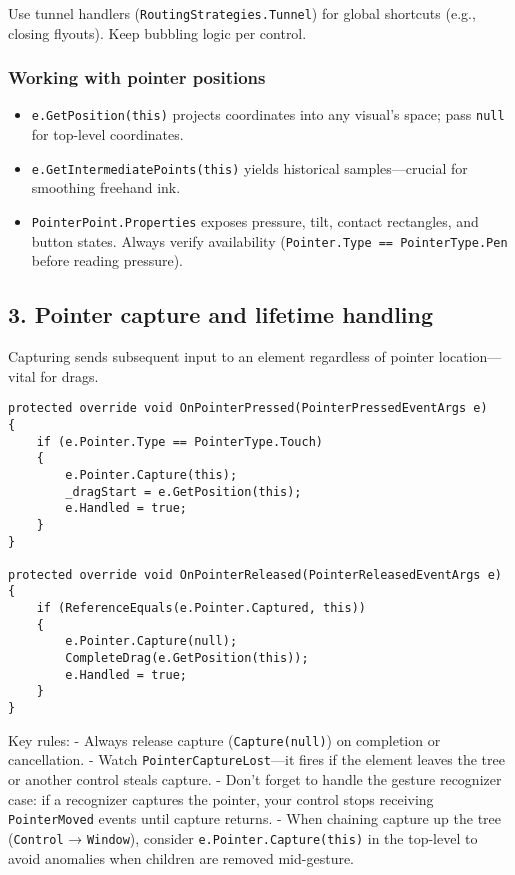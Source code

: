 Use tunnel handlers (\passthrough{\lstinline!RoutingStrategies.Tunnel!})
for global shortcuts (e.g., closing flyouts). Keep bubbling logic per
control.

\subsubsection{Working with pointer
positions}\label{working-with-pointer-positions}

\begin{itemize}
\tightlist
\item
  \passthrough{\lstinline!e.GetPosition(this)!} projects coordinates
  into any visual's space; pass \passthrough{\lstinline!null!} for
  top-level coordinates.
\item
  \passthrough{\lstinline!e.GetIntermediatePoints(this)!} yields
  historical samples---crucial for smoothing freehand ink.
\item
  \passthrough{\lstinline!PointerPoint.Properties!} exposes pressure,
  tilt, contact rectangles, and button states. Always verify
  availability
  (\passthrough{\lstinline!Pointer.Type == PointerType.Pen!} before
  reading pressure).
\end{itemize}

\subsection{3. Pointer capture and lifetime
handling}\label{pointer-capture-and-lifetime-handling}

Capturing sends subsequent input to an element regardless of pointer
location---vital for drags.

\begin{lstlisting}
protected override void OnPointerPressed(PointerPressedEventArgs e)
{
    if (e.Pointer.Type == PointerType.Touch)
    {
        e.Pointer.Capture(this);
        _dragStart = e.GetPosition(this);
        e.Handled = true;
    }
}

protected override void OnPointerReleased(PointerReleasedEventArgs e)
{
    if (ReferenceEquals(e.Pointer.Captured, this))
    {
        e.Pointer.Capture(null);
        CompleteDrag(e.GetPosition(this));
        e.Handled = true;
    }
}
\end{lstlisting}

Key rules: - Always release capture
(\passthrough{\lstinline!Capture(null)!}) on completion or cancellation.
- Watch \passthrough{\lstinline!PointerCaptureLost!}---it fires if the
element leaves the tree or another control steals capture. - Don't
forget to handle the gesture recognizer case: if a recognizer captures
the pointer, your control stops receiving
\passthrough{\lstinline!PointerMoved!} events until capture returns. -
When chaining capture up the tree (\passthrough{\lstinline!Control!} →
\passthrough{\lstinline!Window!}), consider
\passthrough{\lstinline!e.Pointer.Capture(this)!} in the top-level to
avoid anomalies when children are removed mid-gesture.

